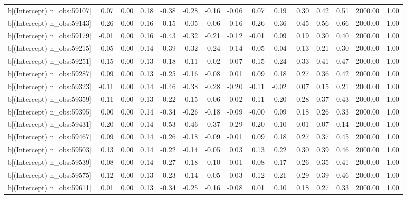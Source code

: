\begin{table}[ht]
\begin{tabular}{rrrrrrrrrrrrrrr}
  b[(Intercept) n\_obs:59107] & 0.07 & 0.00 & 0.18 & -0.38 & -0.28 & -0.16 & -0.06 & 0.07 & 0.19 & 0.30 & 0.42 & 0.51 & 2000.00 & 1.00 \\ 
  b[(Intercept) n\_obs:59143] & 0.26 & 0.00 & 0.16 & -0.15 & -0.05 & 0.06 & 0.16 & 0.26 & 0.36 & 0.45 & 0.56 & 0.66 & 2000.00 & 1.00 \\ 
  b[(Intercept) n\_obs:59179] & -0.01 & 0.00 & 0.16 & -0.43 & -0.32 & -0.21 & -0.12 & -0.01 & 0.09 & 0.19 & 0.30 & 0.40 & 2000.00 & 1.00 \\ 
  b[(Intercept) n\_obs:59215] & -0.05 & 0.00 & 0.14 & -0.39 & -0.32 & -0.24 & -0.14 & -0.05 & 0.04 & 0.13 & 0.21 & 0.30 & 2000.00 & 1.00 \\ 
  b[(Intercept) n\_obs:59251] & 0.15 & 0.00 & 0.13 & -0.18 & -0.11 & -0.02 & 0.07 & 0.15 & 0.24 & 0.33 & 0.41 & 0.47 & 2000.00 & 1.00 \\ 
  b[(Intercept) n\_obs:59287] & 0.09 & 0.00 & 0.13 & -0.25 & -0.16 & -0.08 & 0.01 & 0.09 & 0.18 & 0.27 & 0.36 & 0.42 & 2000.00 & 1.00 \\ 
  b[(Intercept) n\_obs:59323] & -0.11 & 0.00 & 0.14 & -0.46 & -0.38 & -0.28 & -0.20 & -0.11 & -0.02 & 0.07 & 0.15 & 0.21 & 2000.00 & 1.00 \\ 
  b[(Intercept) n\_obs:59359] & 0.11 & 0.00 & 0.13 & -0.22 & -0.15 & -0.06 & 0.02 & 0.11 & 0.20 & 0.28 & 0.37 & 0.43 & 2000.00 & 1.00 \\ 
  b[(Intercept) n\_obs:59395] & 0.00 & 0.00 & 0.14 & -0.34 & -0.26 & -0.18 & -0.09 & -0.00 & 0.09 & 0.18 & 0.26 & 0.33 & 2000.00 & 1.00 \\ 
  b[(Intercept) n\_obs:59431] & -0.20 & 0.00 & 0.14 & -0.53 & -0.46 & -0.37 & -0.29 & -0.20 & -0.10 & -0.01 & 0.07 & 0.14 & 2000.00 & 1.00 \\ 
  b[(Intercept) n\_obs:59467] & 0.09 & 0.00 & 0.14 & -0.26 & -0.18 & -0.09 & -0.01 & 0.09 & 0.18 & 0.27 & 0.37 & 0.45 & 2000.00 & 1.00 \\ 
  b[(Intercept) n\_obs:59503] & 0.13 & 0.00 & 0.14 & -0.22 & -0.14 & -0.05 & 0.03 & 0.13 & 0.22 & 0.30 & 0.39 & 0.46 & 2000.00 & 1.00 \\ 
  b[(Intercept) n\_obs:59539] & 0.08 & 0.00 & 0.14 & -0.27 & -0.18 & -0.10 & -0.01 & 0.08 & 0.17 & 0.26 & 0.35 & 0.41 & 2000.00 & 1.00 \\ 
  b[(Intercept) n\_obs:59575] & 0.12 & 0.00 & 0.13 & -0.23 & -0.14 & -0.05 & 0.03 & 0.12 & 0.21 & 0.29 & 0.39 & 0.46 & 2000.00 & 1.00 \\ 
  b[(Intercept) n\_obs:59611] & 0.01 & 0.00 & 0.13 & -0.34 & -0.25 & -0.16 & -0.08 & 0.01 & 0.10 & 0.18 & 0.27 & 0.33 & 2000.00 & 1.00 \\ 

\end{tabular}
\end{table}
